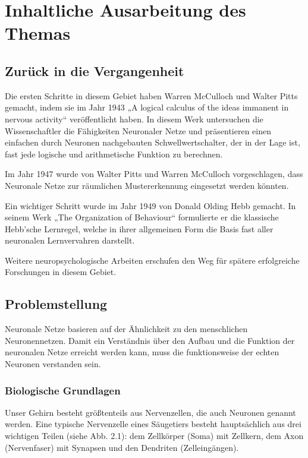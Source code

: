 \section{Inhaltliche Ausarbeitung des Themas}

\subsection{Zurück in die Vergangenheit}

 Die ersten Schritte in diesem Gebiet haben Warren McCulloch und Walter Pitts gemacht, indem sie im Jahr 1943 „A logical calculus of the ideas immanent in nervous activity“ veröffentlicht haben. In diesem Werk  untersuchen die Wissenschaftler die Fähigkeiten Neuronaler Netze und präsentieren einen einfachen durch Neuronen nachgebauten Schwellwertschalter, der in der Lage ist, fast jede logische und arithmetische Funktion zu berechnen.

Im Jahr 1947 wurde von Walter Pitts und Warren McCulloch vorgeschlagen, dass Neuronale Netze zur räumlichen Mustererkennung eingesetzt werden könnten.

Ein wichtiger Schritt wurde im Jahr 1949 von Donald Olding Hebb gemacht. In seinem Werk „The Organization of Behaviour“ formulierte er die klassische Hebb'sche Lernregel, welche in ihrer allgemeinen Form die Basis fast aller neuronalen Lernvervahren darstellt.

Weitere neuropsychologische Arbeiten erschufen den Weg für spätere erfolgreiche Forschungen in diesem Gebiet.

\subsection{Problemstellung}

Neuronale Netze basieren auf der Ähnlichkeit zu den menschlichen Neuronennetzen. Damit ein Verständnis über den Aufbau und die Funktion der neuronalen Netze erreicht werden kann, muss die funktionsweise der echten Neuronen verstanden sein.

\subsubsection{Biologische Grundlagen}

Unser Gehirn besteht größtenteils aus Nervenzellen, die auch Neuronen genannt werden. Eine typische Nervenzelle eines Säugetiers besteht hauptsächlich aus drei wichtigen Teilen (siehe Abb. 2.1): dem Zellkörper (Soma) mit Zellkern, dem Axon (Nervenfaser) mit Synapsen und den Dendriten (Zelleingängen).

